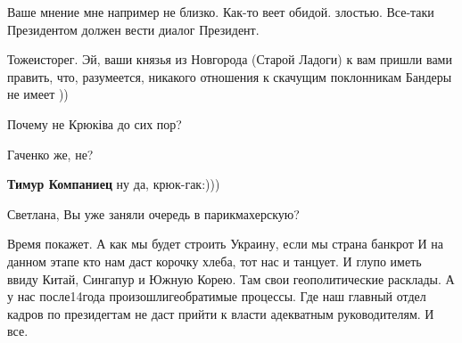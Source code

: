 \begin{itemize}
Ваше мнение мне например не близко. Как-то веет обидой. злостью. Все-таки Президентом должен вести диалог Президент.

 
Тожеисторег.
Эй, ваши князья из Новгорода (Старой Ладоги) к вам пришли вами править, что, разумеется, никакого отношения к скачущим поклонникам Бандеры не имеет ))

 
Почему не Крюківа до сих пор?

\begin{itemize}
 
Гаченко же, не?

 
\textbf{Тимур Компаниец} ну да, крюк-гак:)))
\end{itemize}

 
Светлана, Вы уже заняли очередь в парикмахерскую?

 

Время покажет. А как мы будет строить Украину, если мы страна банкрот И на
данном этапе кто нам даст корочку хлеба, тот нас и танцует. И глупо иметь ввиду
Китай, Сингапур и Южную Корею. Там свои геополитические расклады. А у нас
после14года произошлигеобратимые процессы. Где наш главный отдел кадров по
президегтам не даст прийти к власти адекватным руководителям. И все.



\end{itemize}
